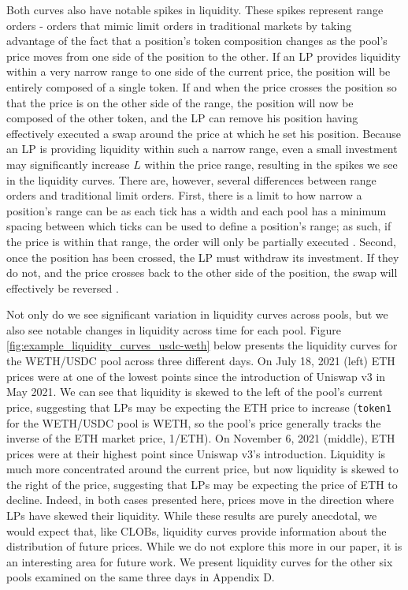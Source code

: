 \documentclass[11pt]{article}
\begin{document}
Both curves also have notable spikes in liquidity. These spikes represent range orders - orders that mimic limit orders in traditional markets by taking advantage of the fact that a position's token composition changes as the pool's price moves from one side of the position to the other. If an LP provides liquidity within a very narrow range to one side of the current price, the position will be entirely composed of a single token. If and when the price crosses the position so that the price is on the other side of the range, the position will now be composed of the other token, and the LP can remove his position having effectively executed a swap around the price at which he set his position. Because an LP is providing liquidity within such a narrow range, even a small investment may significantly increase $L$ within the price range, resulting in the spikes we see in the liquidity curves. There are, however, several differences between range orders and traditional limit orders. First, there is a limit to how narrow a position’s range can be as each tick has a width and each pool has a minimum spacing between which ticks can be used to define a position's range; as such, if the price is within that range, the order will only be partially executed \citep{Uniswapv3}. Second, once the position has been crossed, the LP must withdraw its investment. If they do not, and the price crosses back to the other side of the position, the swap will effectively be reversed \citep{Uniswapv3}.

Not only do we see significant variation in liquidity curves across pools, but we also see notable changes in liquidity across time for each pool. Figure \ref{fig:example_liquidity_curves_usdc-weth} below presents the liquidity curves for the WETH/USDC pool across three different days. On July 18, 2021 (left) ETH prices were at one of the lowest points since the introduction of Uniswap v3 in May 2021. We can see that liquidity is skewed to the left of the pool's current price, suggesting that LPs may be expecting the ETH price to increase (\texttt{token1} for the WETH/USDC pool is WETH, so the pool's price generally tracks the inverse of the ETH market price, 1/ETH). On November 6, 2021 (middle), ETH prices were at their highest point since Uniswap v3's introduction. Liquidity is much more concentrated around the current price, but now liquidity is skewed to the right of the price, suggesting that LPs may be expecting the price of ETH to decline. Indeed, in both cases presented here, prices move in the direction where LPs have skewed their liquidity. While these results are purely anecdotal, we would expect that, like CLOBs, liquidity curves provide information about the distribution of future prices. While we do not explore this more in our paper, it is an interesting area for future work. We present liquidity curves for the other six pools examined on the same three days in Appendix D.
\end{document}
